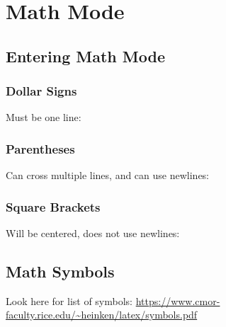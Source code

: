 \section{Math Mode}

\subsection{Entering Math Mode}

\subsubsection{Dollar Signs}
Must be one line:\bigskip\\

\subsubsection{Parentheses}
Can cross multiple lines, and can use newlines:\bigskip\\

\subsubsection{Square Brackets}
Will be centered, does not use newlines:\bigskip\\

\subsection{Math Symbols}
Look here for list of symbols: \url{https://www.cmor-faculty.rice.edu/~heinken/latex/symbols.pdf}
